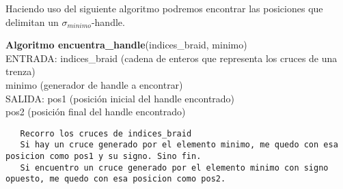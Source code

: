 \newpage
Haciendo uso del siguiente algoritmo podremos encontrar las posiciones que delimitan un $\sigma_{minimo}$-handle.
\begin{alg}
	\textbf{Algoritmo encuentra\_handle}(indices\_braid, minimo)\\
	ENTRADA: indices\_braid (cadena de enteros que representa los cruces de una trenza)\\
	\hspace*{2.2cm} minimo (generador de handle a encontrar) \\
	SALIDA: \hspace{0.4cm} pos1 (posición inicial del handle encontrado) \\
	\hspace*{2.2cm} pos2 (posición final del handle encontrado)
	
\begin{lstlisting}
   Recorro los cruces de indices_braid
   Si hay un cruce generado por el elemento minimo, me quedo con esa posicion como pos1 y su signo. Sino fin.
   Si encuentro un cruce generado por el elemento minimo con signo opuesto, me quedo con esa posicion como pos2.
\end{lstlisting}
\end{alg}

